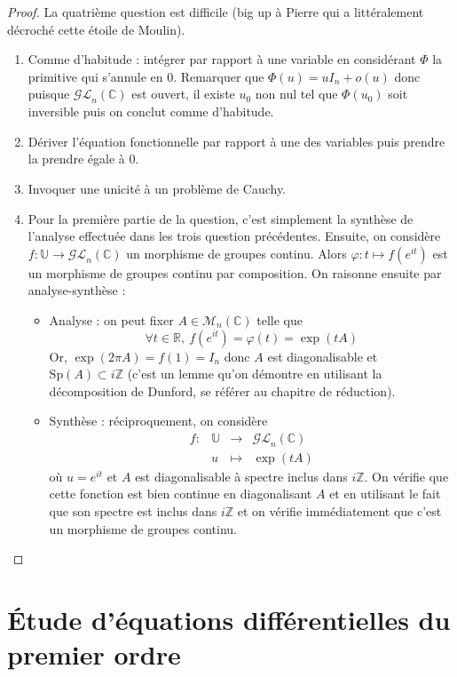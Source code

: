 \documentclass[french,a4paper]{article}
\newcommand{\Z}{\mathbb{Z}}
\newcommand{\R}{\mathbb{R}}
\newcommand{\C}{\mathbb{C}}
\newcommand{\U}{\mathbb{U}}
\theoremstyle{plain}
\theoremstyle{definition}
\theoremstyle{remark}
\begin{document}
\begin{proof}
	La quatrième question est difficile (big up à Pierre qui a littéralement décroché cette étoile de Moulin).
	\begin{enumerate}
		\item Comme d'habitude : intégrer par rapport à une variable en considérant $\Phi$ la primitive qui s'annule en $0$. Remarquer que $\Phi(u)=uI_n+o(u)$ donc puisque $\mathcal{GL}_n(\C)$ est ouvert, il existe $u_0$ non nul tel que $\Phi(u_0)$ soit inversible puis on conclut comme d'habitude.
		\item Dériver l'équation fonctionnelle par rapport à une des variables puis prendre la prendre égale à $0$.
		\item Invoquer une unicité à un problème de Cauchy.
		\item Pour la première partie de la question, c'est simplement la synthèse de l'analyse effectuée dans les trois question précédentes. Ensuite, on considère $f:\U\to\mathcal{GL}_n(\C)$ un morphisme de groupes continu. Alors $\varphi:t\mapsto f(e^{it})$ est un morphisme de groupes continu par composition. On raisonne ensuite par analyse-synthèse :
		\begin{itemize}
			\item Analyse : on peut fixer $A\in\mathcal{M}_n(\C)$ telle que $$\forall t\in\R,\ f(e^{it})=\varphi(t)=\exp(tA)$$ Or, $\exp(2\pi A)=f(1)=I_n$ donc $A$ est diagonalisable et $\text{Sp}(A)\subset i\Z$ (c'est un lemme qu'on démontre en utilisant la décomposition de Dunford, se référer au chapitre de réduction).
			\item Synthèse : réciproquement, on considère $$\begin{array}{lrcl}
				f:&\U&\longrightarrow&\mathcal{GL}_n(\C)\\
				&u&\longmapsto&\exp(tA)
			\end{array}$$ où $u=e^{it}$ et $A$ est diagonalisable à spectre inclus dans $i\Z$. On vérifie que cette fonction est bien continue en diagonalisant $A$ et en utilisant le fait que son spectre est inclus dans $i\Z$ et on vérifie immédiatement que c'est un morphisme de groupes continu.
		\end{itemize}
	\end{enumerate}
\end{proof}

\section{Étude d'équations différentielles du premier ordre}
\end{document}
